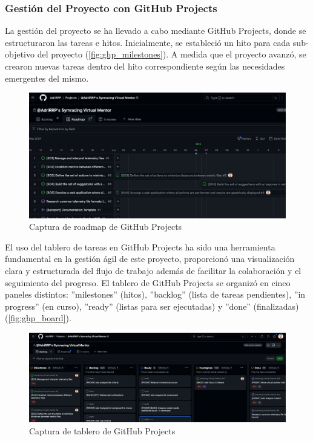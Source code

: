\subsubsection*{Gestión del Proyecto con GitHub Projects}
La gestión del proyecto se ha llevado a cabo mediante GitHub Projects, donde se estructuraron las tareas e hitos. Inicialmente, se estableció un hito para cada sub-objetivo del proyecto (\autoref{fig:ghp_milestones}). A medida que el proyecto avanzó, se crearon nuevas tareas dentro del hito correspondiente según las necesidades emergentes del mismo.
\begin{figure}[H]
	\centering
	\includegraphics[width=0.8\linewidth]{./figs/herramientas/desarrollo/ghproject_roadmap.png}
	\caption[Captura de roadmap de GitHub Projects]{Captura de roadmap de GitHub Projects}
 \label{fig:ghp_milestones}
\end{figure}


El uso del tablero de tareas en GitHub Projects ha sido una herramienta fundamental en la gestión ágil de este proyecto, proporcionó una visualización clara y estructurada del flujo de trabajo además de facilitar la colaboración y el seguimiento del progreso. El tablero de GitHub Projects se organizó en cinco paneles distintos: ''milestones'' (hitos), ''backlog'' (lista de tareas pendientes), ''in progress'' (en curso), ''ready'' (listas para ser ejecutadas) y ''done'' (finalizadas) (\autoref{fig:ghp_board}).

\begin{figure}[H]
	\centering
	\includegraphics[width=0.9\linewidth]{./figs/herramientas/desarrollo/ghproject_board.png}
	\caption[Captura de tablero de GitHub Projects]{Captura de tablero de GitHub Projects}
    \label{fig:ghp_board}
\end{figure}

